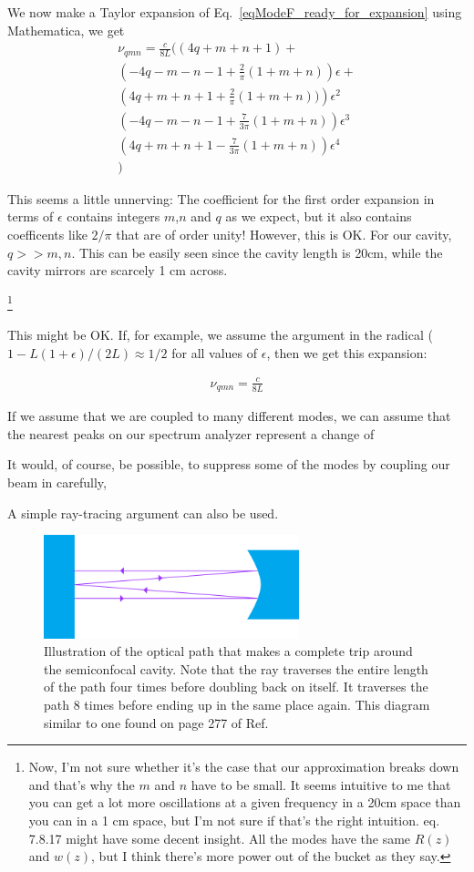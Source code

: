 We now make a Taylor expansion of Eq.\ \ref{eqModeF_ready_for_expansion} using Mathematica, we get 
\begin{align*}
\nu_{qmn}=\frac{c}{8L}\biggl((4q+m+n+1) +\\
 \left(-4q-m-n-1+\frac{2}{\pi}(1+m+n)\right)\epsilon+\\
 \left(4q+m+n+1+\frac{2}{\pi}(1+m+n))\right)\epsilon^2\\
 \left(-4q-m-n-1+\frac{7}{3\pi}(1+m+n)\right)\epsilon^3\\
 \left(4q+m+n+1-\frac{7}{3\pi}(1+m+n)\right)\epsilon^4\\
\biggr)
\end{align*}

This seems a little unnerving: The coefficient for the first order expansion in terms of $\epsilon$ contains integers $m$,$n$ and $q$ as we expect, but it also contains coefficents like $2/\pi$ that are of order unity! However, this is OK. For our cavity, $q>>m,n$. This can be easily seen since the cavity length is 20cm, while the cavity mirrors are scarcely 1 cm across. 

\footnote{Now, I'm not sure whether it's the case that our approximation breaks down and that's why the $m$ and $n$ have to be small. It seems intuitive to me that you can get a lot more oscillations at a given frequency in a 20cm space than you can in a 1 cm space, but I'm not sure if that's the right intuition.\cite{lasersMilonniEberly} eq. 7.8.17 might have some decent insight. All the modes have the same $R(z)$ and $w(z)$, but I think there's more power out of the bucket as they say.  }

This might be OK. If, for example, we assume the argument in the radical ($1-L(1+\epsilon)/(2L)\approx 1/2$ for all values of $\epsilon$, then we get this expansion: 

\begin{align}
\nu_{qmn}=\frac{c}{8L}
\end{align}



If we assume that we are coupled to many different modes, we can assume that the nearest peaks on our spectrum analyzer represent a change of 

It would, of course, be possible, to suppress some of the modes by coupling our beam in carefully, 

A simple ray-tracing argument can also be used. 
\begin{figure}
\centerline{\includegraphics[height=3cm]{spectrum_analyzer_path.png}}
\caption{Illustration of the optical path that makes a complete trip around the semiconfocal cavity. Note that the ray traverses the entire length of the path four times before doubling back on itself. It traverses the path 8 times before ending up in the same place again. This diagram similar to one found on page 277 of Ref.\ \cite{lasersMilonniEberly}}
\end{figure}

